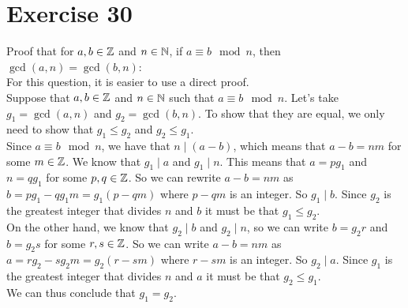 \documentclass[12pt]{article}
\begin{document}
    \section*{Exercise 30}
    Proof that for $a, b \in \mathbb{Z}$ and $n \in \mathbb{N}$,
    if $a \equiv b \mod n$,
    then $\gcd(a, n) = \gcd(b, n)$: \\
    For this question, it is easier to use a direct proof. \\
    Suppose that $a, b \in \mathbb{Z}$ and $n \in \mathbb{N}$
    such that $a \equiv b \mod n$.
    Let's take $g_1 = \gcd(a, n)$ and $g_2 = \gcd(b, n)$.
    To show that they are equal,
    we only need to show that $g_1 \leqslant g_2$
    and $g_2 \leqslant g_1$. \\
    Since $a \equiv b \mod n$,
    we have that $n \mid (a-b)$,
    which means that $a-b = nm$
    for some $m \in \mathbb{Z}$.
    We know that $g_1 \mid a$ and $g_1 \mid n$.
    This means that $a = pg_1$ and $n = qg_1$
    for some $p, q \in \mathbb{Z}$.
    So we can rewrite $a-b = nm$
    as $b = pg_1 - qg_1m = g_1(p - qm)$
    where $p - qm$ is an integer.
    So $g_1 \mid b$.
    Since $g_2$ is the greatest integer that
    divides $n$ and $b$
    it must be that $g_1 \leqslant g_2$. \\
    On the other hand, 
    we know that $g_2 \mid b$ and $g_2 \mid n$,
    so we can write $b = g_2r$ and $b = g_2s$
    for some $r, s \in \mathbb{Z}$. 
    So we can write $a-b = nm$
    as $a = rg_2 - sg_2m = g_2(r - sm)$
    where $r - sm$ is an integer.
    So $g_2 \mid a$.
    Since $g_1$ is the greatest integer that
    divides $n$ and $a$
    it must be that $g_2 \leqslant g_1$. \\
    We can thus conclude that $g_1 = g_2$. \\
\end{document}
